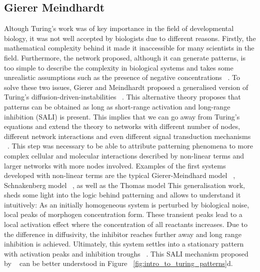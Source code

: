 \subsection{Gierer Meindhardt}
Altough Turing’s work was of key importance in the field of developmental biology, it was not well accepted by biologists due to different reasons.
Firstly, the mathematical complexity behind it made it inaccessible for many scientists in the field.
Furthermore, the network proposed, although it can generate patterns, is too simple to describe the complexity in biological systems and takes some unrealistic assumptions such as the presence of negative concentrations ~\parencite{Kondo2010a}.
To solve these two issues, Gierer and Meindhardt proposed a generalised version of Turing’s diffusion-driven-instabilities ~\parencite{Gierer1972}.
This alternative theory proposes that patterns can be obtained as long as short-range activation and long-range inhibition (SALI) is present.
This implies that we can go away from Turing’s equations and extend the theory to networks with different number of nodes, different network interactions and even different signal transduction mechanisms ~\parencite{Murray1983, Rauch2004, Swindale1980}.
This step was necessary to be able to attribute patterning phenomena to more complex cellular and molecular interactions described by non-linear terms and larger networks with more nodes involved.
Examples of the first systems developed with non-linear terms are the typical Gierer-Meindhard model ~\parencite{Gierer1972}, Schnakenberg model ~\parencite{Schnakenberg1979}, as well as the Thomas model %
This generalisation work, sheds some light into the logic behind patterning and allows to understand it intuitively:
As an initially homogeneous system is perturbed by biological noise, local peaks of morphogen concentration form.
These transient peaks lead to a local activation effect where the concentration of all reactants increases.
Due to the difference in diffusivity, the inhibitor reaches further away and long range inhibition is achieved.
Ultimately, this system settles into a stationary pattern with activation peaks and inhibition troughs ~\parencite{Gierer1972}.
This SALI mechanism proposed by ~\cite{Gierer1972} can be better understood in Figure ~\ref{fig:intro_to_turing_patterns}d.
